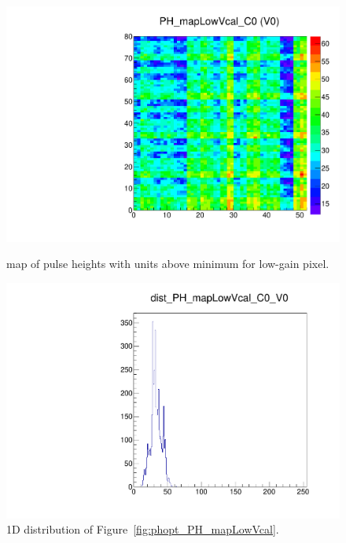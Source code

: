 

\begin{figure}[!htp]
\centering
\begin{minipage}{0.45\textwidth}
  \includegraphics[width=1.0\textwidth]{figures/phopt_PH_mapLowVcal.pdf}
  \caption{\roc map of pulse heights with  units above minimum \vcal for low-gain pixel.}
  \label{fig:phopt_PH_mapLowVcal}
\end{minipage}
\hspace{0.3cm}
\begin{minipage}{0.45\textwidth}
  \includegraphics[width=1.0\textwidth]{figures/phopt_dist_PH_mapLowVcal.pdf}
  \caption{1D distribution of Figure~\ref{fig:phopt_PH_mapLowVcal}.}
  \label{fig:phopt_dist_PH_mapLowVcal}
\end{minipage}
\end{figure}

